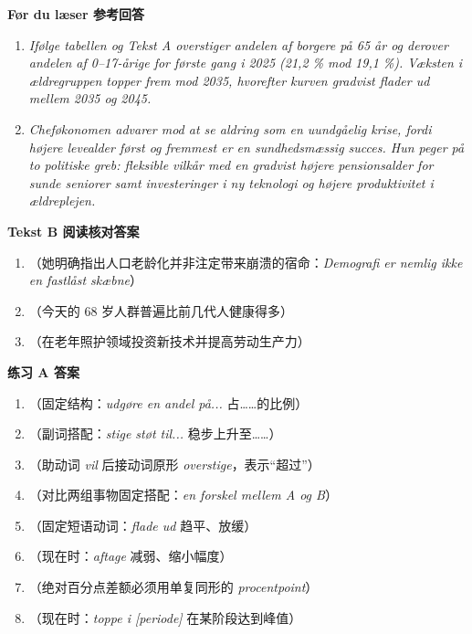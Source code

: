 \begin{answerbox}
\textbf{Før du læser 参考回答}
\begin{enumerate}
  \item \textit{Ifølge tabellen og Tekst A overstiger andelen af borgere på 65 år og derover andelen af 0--17-årige for første gang i 2025 (21,2 \% mod 19,1 \%). Væksten i ældregruppen topper frem mod 2035, hvorefter kurven gradvist flader ud mellem 2035 og 2045.}
  \item \textit{Cheføkonomen advarer mod at se aldring som en uundgåelig krise, fordi højere levealder først og fremmest er en sundhedsmæssig succes. Hun peger på to politiske greb: fleksible vilkår med en gradvist højere pensionsalder for sunde seniorer samt investeringer i ny teknologi og højere produktivitet i ældreplejen.}
\end{enumerate}

\textbf{Tekst B 阅读核对答案}
\begin{enumerate}
  \item {}（她明确指出人口老龄化并非注定带来崩溃的宿命：\textit{Demografi er nemlig ikke en fastlåst skæbne}）
  \item {}（今天的 68 岁人群普遍比前几代人健康得多）
  \item {}（在老年照护领域投资新技术并提高劳动生产力）
\end{enumerate}

\textbf{练习 A 答案}
\begin{enumerate}
  \item {}（固定结构：\textit{udgøre en andel på...} 占……的比例）
  \item {}（副词搭配：\textit{stige støt til...} 稳步上升至……）
  \item {}（助动词 \textit{vil} 后接动词原形 \textit{overstige}，表示“超过”）
  \item {}（对比两组事物固定搭配：\textit{en forskel mellem A og B}）
  \item {}（固定短语动词：\textit{flade ud} 趋平、放缓）
  \item {}（现在时：\textit{aftage} 减弱、缩小幅度）
  \item {}（绝对百分点差额必须用单复同形的 \textit{procentpoint}）
  \item {}（现在时：\textit{toppe i [periode]} 在某阶段达到峰值）
\end{enumerate}


\end{answerbox}
